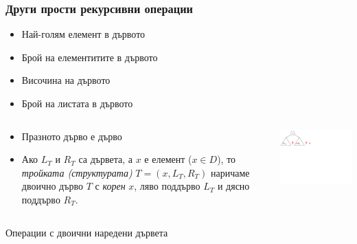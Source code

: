 \documentclass{beamer}
\begin{document}
\begin{frame}[fragile]
\frametitle{Други прости рекурсивни операции}

    \begin{itemize}
      \item Най-голям елемент в дървото 
      \item Брой на елементитите в дървото
      \item Височина на дървото
      \item Брой на листата в дървото
    \end{itemize}


\begin{columns}[t]
  \begin{column}{0.65\textwidth}

    \begin{flushleft}
    \begin{itemize}
      \item Празното дърво е дърво 
      \item Ако $L_T$ и $R_T$ са дървета, а $x$ е елемент ($x \in D$), то \emph{тройката (структурата)} $T=(x,L_T,R_T)$ наричаме двоично дърво $T$ с \emph{корен} $x$, ляво поддърво $L_T$ и дясно поддърво $R_T$.
    \end{itemize}
    \end{flushleft}

  \end{column}
  \begin{column}{0.35\textwidth}

    \includegraphics[width=8cm]{images/tree_recursive_op_qm}

  \end{column}
\end{columns}
\end{frame}


\begin{frame}
\centerline{Операции с двоични наредени дървета}
\end{frame}
\end{document}
